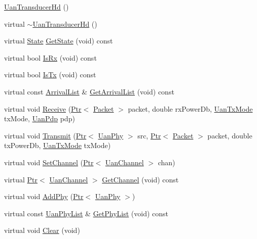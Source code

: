 \begin{DoxyCompactItemize}
\item 
\hyperlink{classns3_1_1UanTransducerHd_ad129224509c6436b87051bb027123e1a}{Uan\+Transducer\+Hd} ()
\item 
virtual \hyperlink{classns3_1_1UanTransducerHd_adc5b95b9acebb46b705a1194ad73d279}{$\sim$\+Uan\+Transducer\+Hd} ()
\item 
virtual \hyperlink{classns3_1_1UanTransducer_a037314c27ca07c9c6234460086058bce}{State} \hyperlink{classns3_1_1UanTransducerHd_a7730eb7c063e8157d5f59d8b43eecda6}{Get\+State} (void) const 
\item 
virtual bool \hyperlink{classns3_1_1UanTransducerHd_a0c4f8a2f077c0dbfa084aebb06af4d07}{Is\+Rx} (void) const 
\item 
virtual bool \hyperlink{classns3_1_1UanTransducerHd_a9eeeff36c45cf71d22ba2c7185230de8}{Is\+Tx} (void) const 
\item 
virtual const \hyperlink{classns3_1_1UanTransducer_a95332a21e30506421a116d4b5c4dfd75}{Arrival\+List} \& \hyperlink{classns3_1_1UanTransducerHd_a4a93c2c0d00a6a2a74d687de8661e300}{Get\+Arrival\+List} (void) const 
\item 
virtual void \hyperlink{classns3_1_1UanTransducerHd_ab0e2ca78a05c4495e8252f64e9906478}{Receive} (\hyperlink{classns3_1_1Ptr}{Ptr}$<$ \hyperlink{classns3_1_1Packet}{Packet} $>$ packet, double rx\+Power\+Db, \hyperlink{classns3_1_1UanTxMode}{Uan\+Tx\+Mode} tx\+Mode, \hyperlink{classns3_1_1UanPdp}{Uan\+Pdp} pdp)
\item 
virtual void \hyperlink{classns3_1_1UanTransducerHd_a59d45284062693608322f87618525cd5}{Transmit} (\hyperlink{classns3_1_1Ptr}{Ptr}$<$ \hyperlink{classns3_1_1UanPhy}{Uan\+Phy} $>$ src, \hyperlink{classns3_1_1Ptr}{Ptr}$<$ \hyperlink{classns3_1_1Packet}{Packet} $>$ packet, double tx\+Power\+Db, \hyperlink{classns3_1_1UanTxMode}{Uan\+Tx\+Mode} tx\+Mode)
\item 
virtual void \hyperlink{classns3_1_1UanTransducerHd_aef19e488b35fc27fa018069bff7d715a}{Set\+Channel} (\hyperlink{classns3_1_1Ptr}{Ptr}$<$ \hyperlink{classns3_1_1UanChannel}{Uan\+Channel} $>$ chan)
\item 
virtual \hyperlink{classns3_1_1Ptr}{Ptr}$<$ \hyperlink{classns3_1_1UanChannel}{Uan\+Channel} $>$ \hyperlink{classns3_1_1UanTransducerHd_ae9649e60219d308416badfadeea716bf}{Get\+Channel} (void) const 
\item 
virtual void \hyperlink{classns3_1_1UanTransducerHd_aad4080d9ebb30654ee561dedc31d8c2f}{Add\+Phy} (\hyperlink{classns3_1_1Ptr}{Ptr}$<$ \hyperlink{classns3_1_1UanPhy}{Uan\+Phy} $>$)
\item 
virtual const \hyperlink{classns3_1_1UanTransducer_a3bac0e2447ad40f48533d14b10d01212}{Uan\+Phy\+List} \& \hyperlink{classns3_1_1UanTransducerHd_a3cf9968bdf675bf81b001343b046c573}{Get\+Phy\+List} (void) const 
\item 
virtual void \hyperlink{classns3_1_1UanTransducerHd_a55c3ccc60f3ca051b6c722fbdbbbaed8}{Clear} (void)
\end{DoxyCompactItemize}
